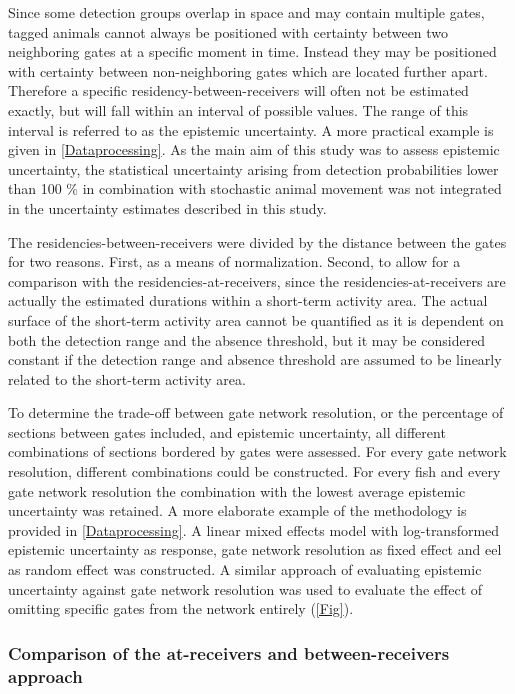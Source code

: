 \documentclass[preprint,12pt,authoryear]{elsarticle}
\begin{document}
\begin{spacing}{1.9}
Since some detection groups overlap in space and may contain multiple gates, tagged animals cannot always be positioned with certainty between two neighboring gates at a specific moment in time. Instead they may be positioned with certainty between non-neighboring gates which are located further apart. Therefore a specific residency-between-receivers will often not be estimated exactly, but will fall within an interval of possible values. The range of this interval is referred to as the epistemic uncertainty. A more practical example is given in \ref{Dataprocessing}. As the main aim of this study was to assess epistemic uncertainty, the statistical uncertainty arising from detection probabilities lower than 100 \% in combination with stochastic animal movement was not integrated in the uncertainty estimates described in this study. 

The residencies-between-receivers were divided by the distance between the gates for two reasons. First, as a means of normalization. Second, to allow for a comparison with the residencies-at-receivers, since the residencies-at-receivers are actually the estimated durations within a short-term activity area. The actual surface of the short-term activity area cannot be quantified as it is dependent on both the detection range and the absence threshold, but it may be considered constant if the detection range and absence threshold are assumed to be linearly related to the short-term activity area. 

To determine the trade-off between gate network resolution, or the percentage of sections between gates included, and epistemic uncertainty, all different combinations of sections bordered by gates were assessed. For every gate network resolution, different combinations could be constructed. For every fish and every gate network resolution the combination with the lowest average epistemic uncertainty was retained. A more elaborate example of the methodology is provided in \ref{Dataprocessing}. A linear mixed effects model with log-transformed epistemic uncertainty as response, gate network resolution as fixed effect and eel as random effect was constructed. A similar approach of evaluating epistemic uncertainty against gate network resolution was used to evaluate the effect of omitting specific gates from the network entirely (\ref{Fig}). 

\subsubsection{Comparison of the at-receivers and between-receivers approach}


\end{spacing}
\end{document}
